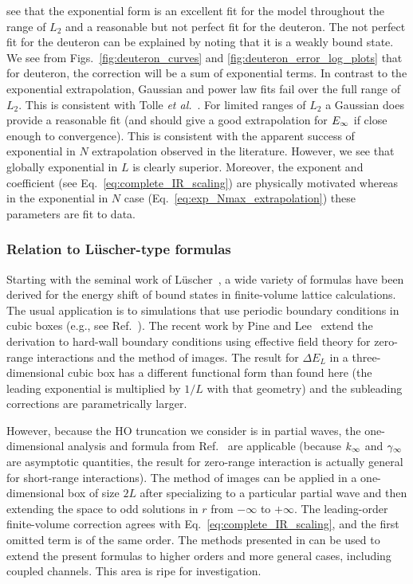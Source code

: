 	see that the exponential form is an excellent fit for the model
	throughout the range of $L_2$ and a reasonable but not perfect fit for
	the deuteron.  The not perfect fit for the deuteron can be explained
	by noting that it is a weakly bound state.  We see from
	Figs.~\ref{fig:deuteron_curves} and \ref{fig:deuteron_error_log_plots}
	that for deuteron, the correction will be a sum of exponential terms.
	In contrast to the exponential extrapolation, Gaussian and power law fits
	fail over the full range of $L_2$.  This is consistent with
	Tolle {\it et al.}~\cite{Tolle:2012cx}.  For limited ranges of $L_2$ a
	Gaussian does	provide a reasonable fit (and should give a good extrapolation
	for	$E_{\infty}$ if close enough to convergence).  This is consistent with the
	apparent success of exponential in $N$ extrapolation observed in the
	literature.  However, we see that globally exponential in $L$ is clearly
	superior.  Moreover, the exponent and coefficient (see
	Eq.~\eqref{eq:complete_IR_scaling}) are physically motivated whereas in the
	exponential in $N$ case (Eq.~\eqref{eq:exp_Nmax_extrapolation}) these
	parameters are fit to data.

	\medskip
	\subsubsection{Relation to L\"{u}scher-type formulas}

	Starting with the seminal work of L\"uscher~\cite{Luscher:1985dn}, a
	wide variety of formulas have been derived for the energy shift of
	bound states in finite-volume lattice calculations.  The usual
	application is to simulations that use periodic boundary conditions in
	cubic boxes (e.g., see Ref.~\cite{Konig:2011ti}).  The recent work by
	Pine and Lee~\cite{Lee:2010km,Pine:2012zv} extend the derivation to
	hard-wall boundary conditions using effective field theory for
	zero-range interactions and the method of images.  The result for
	$\Delta E_L$ in a three-dimensional cubic box has a different
	functional form than found here (the leading exponential is multiplied
	by $1/L$ with that geometry) and the subleading corrections are
	parametrically larger.

	However, because the HO truncation we consider is in partial waves,
	the one-dimensional analysis and formula from Ref.~\cite{Pine:2012zv}
	are applicable (because $k_{\infty}$ and $\gamma_\infty$ are asymptotic quantities,
	the result for zero-range interaction is actually general for
	short-range interactions).  The method of images can be applied in a
	one-dimensional box of size $2L$ after specializing to a particular
	partial wave and then extending the space to odd solutions in $r$ from
	$-\infty$ to $+\infty$.  The leading-order finite-volume correction
	agrees with Eq.~\eqref{eq:complete_IR_scaling}, and the first omitted term
	is of the same order.
	The methods presented in \cite{Lee:2010km,Pine:2012zv}
	can be used to extend the present formulas to higher
	orders and more general cases, including coupled channels.  This area
	is ripe for investigation.


